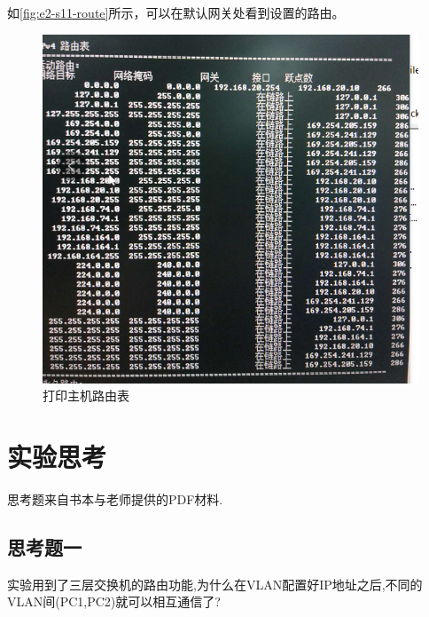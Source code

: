 \documentclass{myreport}
\begin{document}
如\autoref{fig:e2-s11-route}所示，可以在默认网关处看到设置的路由。

\begin{figure}[htp]
    \centering
    \includegraphics[width=13cm]{"./figure/2018-05-18-02-39-50.png"}
    \caption{打印主机路由表}
    \label{fig:e2-s11-route}
\end{figure}


\section{实验思考}

思考题来自书本与老师提供的PDF材料.

\subsection{思考题一}

\begin{tcolorbox}[title = {思考题一}]
实验用到了三层交换机的路由功能,为什么在VLAN配置好IP地址之后,不同的VLAN间(PC1,PC2)就可以相互通信了?
\end{tcolorbox}
\end{document}
